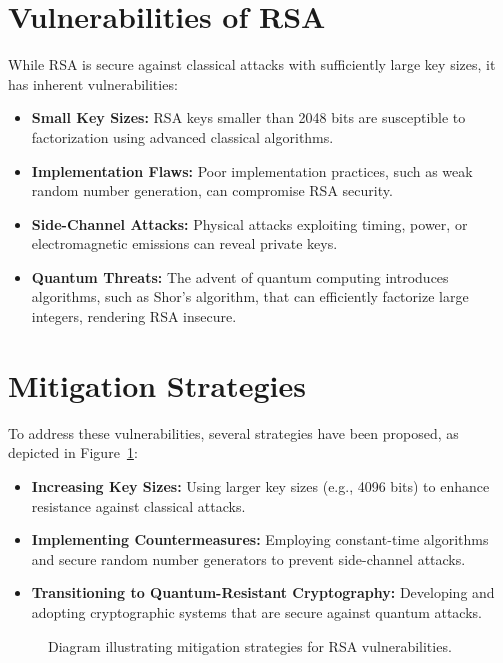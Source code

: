 \documentclass[12pt,a4paper]{report}
\begin{document}
\section{Vulnerabilities of RSA}
While RSA is secure against classical attacks with sufficiently large key sizes, it has inherent vulnerabilities:
\begin{itemize}
    \item \textbf{Small Key Sizes:} RSA keys smaller than 2048 bits are susceptible to factorization using advanced classical algorithms.
    \item \textbf{Implementation Flaws:} Poor implementation practices, such as weak random number generation, can compromise RSA security.
    \item \textbf{Side-Channel Attacks:} Physical attacks exploiting timing, power, or electromagnetic emissions can reveal private keys.
    \item \textbf{Quantum Threats:} The advent of quantum computing introduces algorithms, such as Shor's algorithm, that can efficiently factorize large integers, rendering RSA insecure.
\end{itemize}

\section{Mitigation Strategies}
To address these vulnerabilities, several strategies have been proposed, as depicted in Figure~\ref{fig:mitigation_strategies}:
\begin{itemize}
    \item \textbf{Increasing Key Sizes:} Using larger key sizes (e.g., 4096 bits) to enhance resistance against classical attacks.
    \item \textbf{Implementing Countermeasures:} Employing constant-time algorithms and secure random number generators to prevent side-channel attacks.
    \item \textbf{Transitioning to Quantum-Resistant Cryptography:} Developing and adopting cryptographic systems that are secure against quantum attacks.
\end{itemize}

\begin{figure}[ht!]%
    \centering
    \caption{Diagram illustrating mitigation strategies for RSA vulnerabilities.}\label{fig:mitigation_strategies}
\end{figure}
\end{document}
